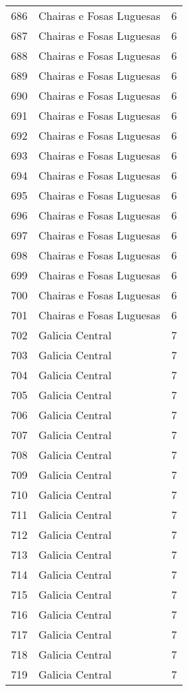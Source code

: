 \begin{table}[p]
\begin{tabular}{rlr}
  686 & Chairas e Fosas Luguesas &   6 \\ 
  687 & Chairas e Fosas Luguesas &   6 \\ 
  688 & Chairas e Fosas Luguesas &   6 \\ 
  689 & Chairas e Fosas Luguesas &   6 \\ 
  690 & Chairas e Fosas Luguesas &   6 \\ 
  691 & Chairas e Fosas Luguesas &   6 \\ 
  692 & Chairas e Fosas Luguesas &   6 \\ 
  693 & Chairas e Fosas Luguesas &   6 \\ 
  694 & Chairas e Fosas Luguesas &   6 \\ 
  695 & Chairas e Fosas Luguesas &   6 \\ 
  696 & Chairas e Fosas Luguesas &   6 \\ 
  697 & Chairas e Fosas Luguesas &   6 \\ 
  698 & Chairas e Fosas Luguesas &   6 \\ 
  699 & Chairas e Fosas Luguesas &   6 \\ 
  700 & Chairas e Fosas Luguesas &   6 \\ 
  701 & Chairas e Fosas Luguesas &   6 \\ 
  702 & Galicia Central &   7 \\ 
  703 & Galicia Central &   7 \\ 
  704 & Galicia Central &   7 \\ 
  705 & Galicia Central &   7 \\ 
  706 & Galicia Central &   7 \\ 
  707 & Galicia Central &   7 \\ 
  708 & Galicia Central &   7 \\ 
  709 & Galicia Central &   7 \\ 
  710 & Galicia Central &   7 \\ 
  711 & Galicia Central &   7 \\ 
  712 & Galicia Central &   7 \\ 
  713 & Galicia Central &   7 \\ 
  714 & Galicia Central &   7 \\ 
  715 & Galicia Central &   7 \\ 
  716 & Galicia Central &   7 \\ 
  717 & Galicia Central &   7 \\ 
  718 & Galicia Central &   7 \\ 
  719 & Galicia Central &   7 \\ 

\end{tabular}
\end{table}
